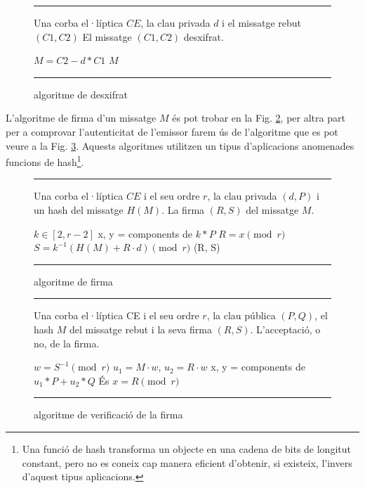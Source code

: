 \documentclass[journal]{IEEEtran}
\begin{document}
\begin{figure}
\hrule
\hspace*{2pt}
\begin{algorithmic}[1]
	\REQUIRE Una corba el·líptica $CE$, la clau privada $d$ i el missatge rebut $(C1,C2)$
	\ENSURE El missatge $(C1,C2)$ desxifrat.
	
	\medskip
	\STATE $M=C2 - d*C1$
	\RETURN $M$
\end{algorithmic}
\hrule
\caption{algoritme de desxifrat}\label{DesxifratCE}
\end{figure}

L'algoritme de firma d'un missatge $M$ és pot trobar en la Fig. \ref{FirmaCE}, per altra part per a comprovar l'autenticitat de l'emissor farem ús de l'algoritme que es pot veure a la Fig. \ref{VerificarFirma}. Aquests algoritmes utilitzen un tipus d'aplicacions anomenades funcions de hash\footnote{Una funció de hash transforma un objecte en una cadena de bits de longitut constant, pero no es coneix cap manera eficient d'obtenir, si existeix, l'invers d'aquest tipus aplicacions.}.

\begin{figure}[h!]
\hrule
\hspace*{2pt}
\begin{algorithmic}[1]
\REQUIRE Una corba el·líptica $CE$ i el seu ordre $r$, la clau privada $(d, P)$ i un hash del missatge $H(M)$.
\ENSURE La firma $(R, S)$ del missatge $M$.

\medskip

\STATE $k \in [2, r-2]$
\STATE x, y = components de $k*P$
\STATE $R = x \pmod{r}$
\STATE $S = k^{-1} (H(M) + R \cdot d) \pmod{r}$
\RETURN (R, S)
\end{algorithmic}
\hrule
\caption{algoritme de firma} \label{FirmaCE}
\end{figure}

\begin{figure}[h!]
\hrule
\hspace*{2pt}
\begin{algorithmic}[1]
\REQUIRE Una corba el·líptica CE i el seu ordre $r$, la clau pública $(P, Q)$, el hash $M$ del missatge rebut i la seva firma $(R, S)$.
\ENSURE L'acceptació, o no, de la firma.

\medskip

\STATE $w = S^{-1} \pmod{r}$
\STATE $u_1 = M \cdot w$, $u_2 = R \cdot w$
\STATE x, y = components de $u_1 * P + u_2 * Q$
\RETURN És $x = R \pmod{r}$
\end{algorithmic}
\hrule
\caption{algoritme de verificació de la firma} \label{VerificarFirma}
\end{figure}
\end{document}
